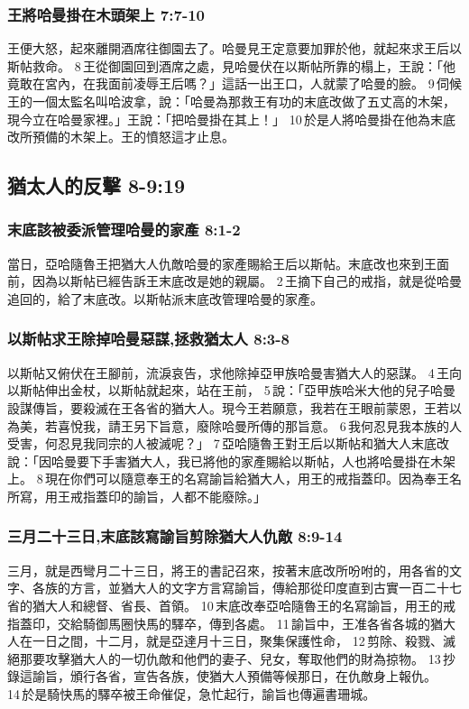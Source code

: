 \subsubsection{王將哈曼掛在木頭架上 7:7-10}
王便大怒，起來離開酒席往御園去了。哈曼見王定意要加罪於他，就起來求王后以斯帖救命。 8 王從御園回到酒席之處，見哈曼伏在以斯帖所靠的榻上，王說：「他竟敢在宮內，在我面前凌辱王后嗎？」這話一出王口，人就蒙了哈曼的臉。 9 伺候王的一個太監名叫哈波拿，說：「哈曼為那救王有功的末底改做了五丈高的木架，現今立在哈曼家裡。」王說：「把哈曼掛在其上！」 10 於是人將哈曼掛在他為末底改所預備的木架上。王的憤怒這才止息。

\subsection{猶太人的反擊 8-9:19}
\subsubsection{末底該被委派管理哈曼的家產 8:1-2}
當日，亞哈隨魯王把猶大人仇敵哈曼的家產賜給王后以斯帖。末底改也來到王面前，因為以斯帖已經告訴王末底改是她的親屬。 2 王摘下自己的戒指，就是從哈曼追回的，給了末底改。以斯帖派末底改管理哈曼的家產。

\subsubsection{以斯帖求王除掉哈曼惡謀,拯救猶太人 8:3-8}
以斯帖又俯伏在王腳前，流淚哀告，求他除掉亞甲族哈曼害猶大人的惡謀。 4 王向以斯帖伸出金杖，以斯帖就起來，站在王前， 5 說：「亞甲族哈米大他的兒子哈曼設謀傳旨，要殺滅在王各省的猶大人。現今王若願意，我若在王眼前蒙恩，王若以為美，若喜悅我，請王另下旨意，廢除哈曼所傳的那旨意。 6 我何忍見我本族的人受害，何忍見我同宗的人被滅呢？」 7 亞哈隨魯王對王后以斯帖和猶大人末底改說：「因哈曼要下手害猶大人，我已將他的家產賜給以斯帖，人也將哈曼掛在木架上。 8 現在你們可以隨意奉王的名寫諭旨給猶大人，用王的戒指蓋印。因為奉王名所寫，用王戒指蓋印的諭旨，人都不能廢除。」

\subsubsection{三月二十三日,末底該寫諭旨剪除猶大人仇敵 8:9-14}
三月，就是西彎月二十三日，將王的書記召來，按著末底改所吩咐的，用各省的文字、各族的方言，並猶大人的文字方言寫諭旨，傳給那從印度直到古實一百二十七省的猶大人和總督、省長、首領。 10 末底改奉亞哈隨魯王的名寫諭旨，用王的戒指蓋印，交給騎御馬圈快馬的驛卒，傳到各處。 11 諭旨中，王准各省各城的猶大人在一日之間，十二月，就是亞達月十三日，聚集保護性命， 12 剪除、殺戮、滅絕那要攻擊猶大人的一切仇敵和他們的妻子、兒女，奪取他們的財為掠物。 13 抄錄這諭旨，頒行各省，宣告各族，使猶大人預備等候那日，在仇敵身上報仇。 14 於是騎快馬的驛卒被王命催促，急忙起行，諭旨也傳遍書珊城。

